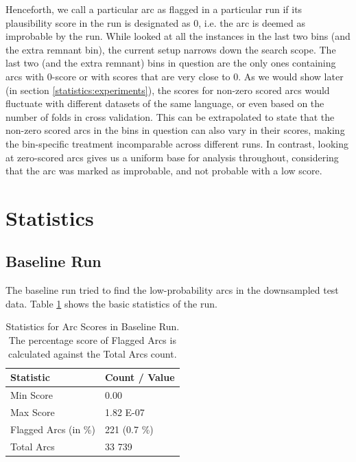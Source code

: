 Henceforth, we call a particular arc as flagged in a particular run if its plausibility score in the run is designated as 0, i.e. the arc is deemed as improbable by the run. While \cite{alzetta2017dangerous} looked at all the instances in the last two bins (and the extra remnant bin), the current setup narrows down the search scope. The last two (and the extra remnant) bins in question are the only ones containing arcs with 0-score or with scores that are very close to 0. As we would show later (in section \ref{statistics:experiments}), the scores for non-zero scored arcs would fluctuate with different datasets of the same language, or even based on the number of folds in cross validation. This can be extrapolated to state that the non-zero scored arcs in the bins in question can also vary in their scores, making the bin-specific treatment incomparable across different runs. In contrast, looking at zero-scored arcs gives us a uniform base for analysis throughout, considering that the arc was marked as improbable, and not probable with a low score.

\section{Statistics}
\label{baseline:lisca}

\subsection{Baseline Run}
\label{statistics:baseline}

The baseline run tried to find the low-probability arcs in the downsampled test data. Table \ref{tab:stats_baseline} shows the basic statistics of the run.

\begin{table}[H]
    \centering
    \begin{tabular}{|l|l|}
        \hline
        \textbf{Statistic} & \textbf{Count / Value} \\
        \hline
        Min Score & 0.00\\
        Max Score & 1.82 E-07\\
        Flagged Arcs (in \%) & 221 (0.7 \%)\\
        Total Arcs & 33 739\\
        \hline
    \end{tabular}
    \caption[Statistics for Arc Scores in Baseline Run]{Statistics for Arc Scores in Baseline Run. The percentage score of Flagged Arcs is calculated against the Total Arcs count.}
    \label{tab:stats_baseline}
\end{table}

